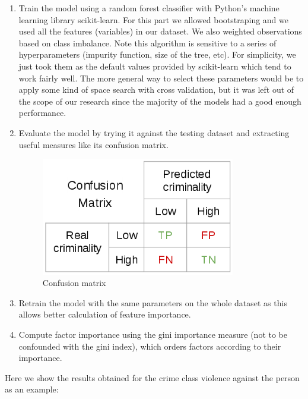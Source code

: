 \documentclass[12pt, openany]{report}
\begin{document}
\begin{enumerate}
\item Train the model using a random forest classifier \cite{breiman01} with Python's machine learning library scikit-learn. For this part we allowed bootstraping and we used all the features (variables) in our dataset. We also weighted observations based on class imbalance.
Note this algorithm is sensitive to a series of hyperparameters (impurity function, size of the tree, etc). For simplicity, we just took them as the default values provided by scikit-learn which tend to work fairly well.
The more general way to select these parameters would be to apply some kind of space search with cross validation, but it was left out of the scope of our research since the majority of the models had a good enough performance.

\item Evaluate the model by trying it against the testing dataset and extracting useful measures like its confusion matrix.

\begin{figure}[h!]
\centering
        \includegraphics[width=0.8\textwidth]{images/confusion_matrix.png}
        \caption{Confusion matrix}
\end{figure}

\item Retrain the model with the same parameters on the whole dataset as this allows better calculation of feature importance.

\item Compute factor importance using the gini importance measure \cite{breiman84} (not to be confounded with the gini index), which orders factors according to their importance.

\end{enumerate}

Here we show the results obtained for the crime class violence against the person as an example:
\end{document}
